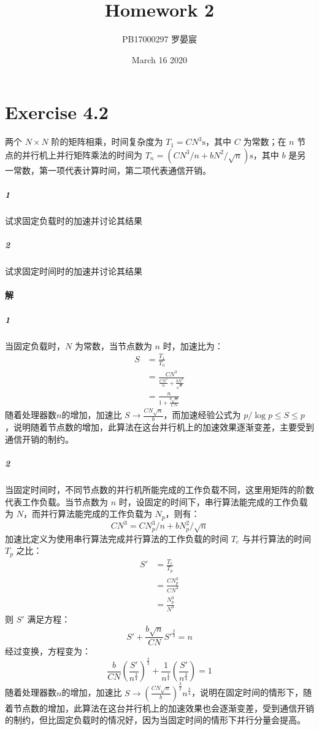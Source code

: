 \documentclass{article}
\title{Homework 2}
\author{PB17000297 罗晏宸}
\date{March 16 2020}
\begin{document}
\maketitle

\section{Exercise 4.2}
两个 $N \times N$ 阶的矩阵相乘，时间复杂度为 $T_1 = CN^3\si{\second}$，其中 $C$ 为常数；在 $n$ 节点的并行机上并行矩阵乘法的时间为 $T_n = (CN^3 / n + bN^2 / \sqrt{n})\si{\second}$，其中 $b$ 是另一常数，第一项代表计算时间，第二项代表通信开销。
\subparagraph{1} 试求固定负载时的加速并讨论其结果
\subparagraph{2} 试求固定时间时的加速并讨论其结果

\paragraph{解}
\subparagraph{1} 当固定负载时，$N$ 为常数，当节点数为 $n$ 时，加速比为：
\begin{align*}
    S &= \frac{T_1}{T_n} \\
    &= \frac{CN^3}{\frac{CN^3}{n} + \frac{bN^2}{\sqrt{n}}} \\
    &= \frac{n}{1 + \frac{b\sqrt{n}}{CN}}
\end{align*}
随着处理器数$n$的增加，加速比 $S \rightarrow \frac{CN\sqrt{n}}{b}$，而加速经验公式为 $p / \log p \leqslant S \leqslant p$ ，说明随着节点数的增加，此算法在这台并行机上的加速效果逐渐变差，主要受到通信开销的制约。

\subparagraph{2} 当固定时间时，不同节点数的并行机所能完成的工作负载不同，这里用矩阵的阶数代表工作负载。当节点数为 $n$ 时，设固定的时间下，串行算法能完成的工作负载为 $N$，而并行算法能完成的工作负载为 $N_p$，则有：
\begin{equation*}
    CN^3 = CN_p^3 / n + bN_p^2 / \sqrt{n}
\end{equation*}
加速比定义为使用串行算法完成并行算法的工作负载的时间 $T_e$ 与并行算法的时间 $T_p$ 之比：
\begin{align*}
    S' &= \frac{T_e}{T_p} \\
    &= \frac{CN_p^3}{CN^3} \\
    &= \frac{N_p^3}{N^3}
\end{align*}
则 $S'$ 满足方程：
\begin{equation*}
    S' + \frac{b\sqrt{n}}{CN}S'^{\frac{2}{3}} = n
\end{equation*}
经过变换，方程变为：
\begin{equation*}
    \frac{b}{CN}\left(\frac{S'}{n^{\frac{3}{4}}}\right)^{\frac{2}{3}} + \frac{1}{n^{\frac{1}{4}}}\left(\frac{S'}{n^{\frac{3}{4}}}\right) = 1
\end{equation*}
随着处理器数$n$的增加，加速比 $S \rightarrow \left(\frac{CN\sqrt{n}}{b}\right)^\frac{3}{2}n^{\frac{3}{4}}$，说明在固定时间的情形下，随着节点数的增加，此算法在这台并行机上的加速效果也会逐渐变差，受到通信开销的制约，但比固定负载时的情况好，因为当固定时间的情形下并行分量会提高。
\end{document}
